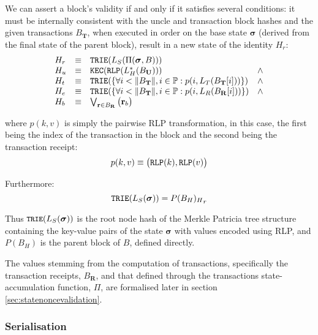 \documentclass[9pt,oneside]{amsart}
\begin{document}
\begin{multicols}{2}
We can assert a block's validity if and only if it satisfies several conditions: it must be internally consistent with the uncle and transaction block hashes and the given transactions $B_\mathbf{T}$, when executed in order on the base state $\boldsymbol{\sigma}$ (derived from the final state of the parent block), result in a new state of the identity $H_r$:
\begin{equation}
\begin{array}[t]{lclc}
H_r &\equiv& \mathtt{\small TRIE}(L_S(\Pi(\boldsymbol{\sigma}, B))) & \\
H_u &\equiv& \mathtt{\small KEC}(\mathtt{\small RLP}(L_H^*(B_\mathbf{U}))) & \wedge \\
H_t &\equiv& \mathtt{\small TRIE}(\{\forall i < \lVert B_\mathbf{T} \rVert, i \in \mathbb{P}: p(i, L_T(B_\mathbf{T}[i]))\}) & \wedge \\
H_e &\equiv& \mathtt{\small TRIE}(\{\forall i < \lVert B_\mathbf{T} \rVert, i \in \mathbb{P}: p(i, L_R(B_\mathbf{R}[i]))\}) & \wedge \\
H_b &\equiv& \bigvee_{\mathbf{r} \in B_\mathbf{R}} \big( \mathbf{r}_b \big)
\end{array}
\end{equation}

where $p(k, v)$ is simply the pairwise RLP transformation, in this case, the first being the index of the transaction in the block and the second being the transaction receipt:
\begin{equation}
p(k, v) \equiv \big( \mathtt{\small RLP}(k), \mathtt{\small RLP}(v) \big)
\end{equation}

Furthermore:
\begin{equation}
\mathtt{\small TRIE}(L_S(\boldsymbol{\sigma})) = {P(B_H)_H}_r
\end{equation}

Thus $\texttt{\small TRIE}(L_S(\boldsymbol{\sigma}))$ is the root node hash of the Merkle Patricia tree structure containing the key-value pairs of the state $\boldsymbol{\sigma}$ with values encoded using RLP, and $P(B_H)$ is the parent block of $B$, defined directly.

The values stemming from the computation of transactions, specifically the transaction receipts, $B_\mathbf{R}$, and that defined through the transactions state-accumulation function, $\Pi$, are formalised later in section \ref{sec:statenoncevalidation}.

\subsubsection{Serialisation}


\end{multicols}
\end{document}
